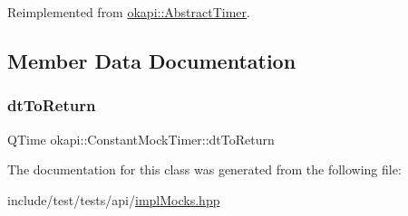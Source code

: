 Reimplemented from \mbox{\hyperlink{classokapi_1_1AbstractTimer_a9153fc8d0b6daf843fa533bf601a15dd}{okapi\+::\+Abstract\+Timer}}.



\subsection{Member Data Documentation}
\mbox{\label{classokapi_1_1ConstantMockTimer_a1a915222d11024eb55b5ce11fb6fd2be}} 
\subsubsection{\texorpdfstring{dtToReturn}{dtToReturn}}
{\footnotesize\ttfamily Q\+Time okapi\+::\+Constant\+Mock\+Timer\+::dt\+To\+Return}



The documentation for this class was generated from the following file\+:\begin{DoxyCompactItemize}
\item 
include/test/tests/api/\mbox{\hyperlink{implMocks_8hpp}{impl\+Mocks.\+hpp}}\end{DoxyCompactItemize}
